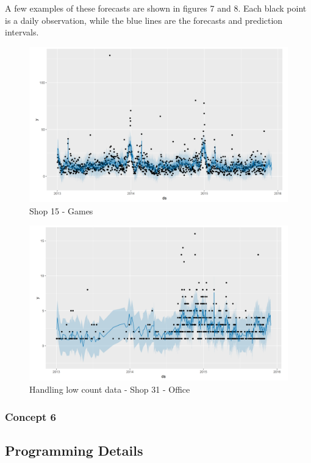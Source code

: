 \documentclass[floatsintext,man]{apa6}
\theoremstyle{definition}
\theoremstyle{definition}
\theoremstyle{definition}
\theoremstyle{remark}
\begin{document}
A few examples of these forecasts are shown in figures 7 and 8. Each
black point is a daily observation, while the blue lines are the
forecasts and prediction intervals.

\begin{figure}
\centering
\includegraphics{../graphs/prophet/S15Games.png}
\caption{Shop 15 - Games}
\end{figure}

\begin{figure}
\centering
\includegraphics{../graphs/prophet/S31Office.png}
\caption{Handling low count data - Shop 31 - Office}
\end{figure}

\subsubsection{Concept 6}\label{concept-6}

\subsection{Programming Details}\label{programming-details}
\end{document}
